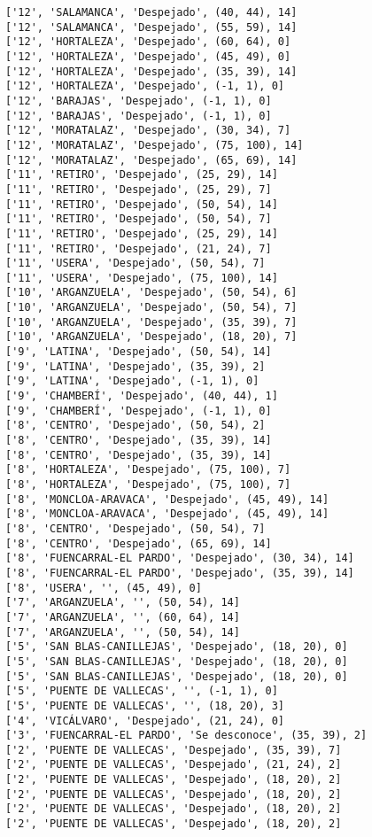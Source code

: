 \documentclass[11pt]{article}
\begin{document}
\begin{Verbatim}[commandchars=\\\{\}]
['12', 'SALAMANCA', 'Despejado', (40, 44), 14]
['12', 'SALAMANCA', 'Despejado', (55, 59), 14]
['12', 'HORTALEZA', 'Despejado', (60, 64), 0]
['12', 'HORTALEZA', 'Despejado', (45, 49), 0]
['12', 'HORTALEZA', 'Despejado', (35, 39), 14]
['12', 'HORTALEZA', 'Despejado', (-1, 1), 0]
['12', 'BARAJAS', 'Despejado', (-1, 1), 0]
['12', 'BARAJAS', 'Despejado', (-1, 1), 0]
['12', 'MORATALAZ', 'Despejado', (30, 34), 7]
['12', 'MORATALAZ', 'Despejado', (75, 100), 14]
['12', 'MORATALAZ', 'Despejado', (65, 69), 14]
['11', 'RETIRO', 'Despejado', (25, 29), 14]
['11', 'RETIRO', 'Despejado', (25, 29), 7]
['11', 'RETIRO', 'Despejado', (50, 54), 14]
['11', 'RETIRO', 'Despejado', (50, 54), 7]
['11', 'RETIRO', 'Despejado', (25, 29), 14]
['11', 'RETIRO', 'Despejado', (21, 24), 7]
['11', 'USERA', 'Despejado', (50, 54), 7]
['11', 'USERA', 'Despejado', (75, 100), 14]
['10', 'ARGANZUELA', 'Despejado', (50, 54), 6]
['10', 'ARGANZUELA', 'Despejado', (50, 54), 7]
['10', 'ARGANZUELA', 'Despejado', (35, 39), 7]
['10', 'ARGANZUELA', 'Despejado', (18, 20), 7]
['9', 'LATINA', 'Despejado', (50, 54), 14]
['9', 'LATINA', 'Despejado', (35, 39), 2]
['9', 'LATINA', 'Despejado', (-1, 1), 0]
['9', 'CHAMBERÍ', 'Despejado', (40, 44), 1]
['9', 'CHAMBERÍ', 'Despejado', (-1, 1), 0]
['8', 'CENTRO', 'Despejado', (50, 54), 2]
['8', 'CENTRO', 'Despejado', (35, 39), 14]
['8', 'CENTRO', 'Despejado', (35, 39), 14]
['8', 'HORTALEZA', 'Despejado', (75, 100), 7]
['8', 'HORTALEZA', 'Despejado', (75, 100), 7]
['8', 'MONCLOA-ARAVACA', 'Despejado', (45, 49), 14]
['8', 'MONCLOA-ARAVACA', 'Despejado', (45, 49), 14]
['8', 'CENTRO', 'Despejado', (50, 54), 7]
['8', 'CENTRO', 'Despejado', (65, 69), 14]
['8', 'FUENCARRAL-EL PARDO', 'Despejado', (30, 34), 14]
['8', 'FUENCARRAL-EL PARDO', 'Despejado', (35, 39), 14]
['8', 'USERA', '', (45, 49), 0]
['7', 'ARGANZUELA', '', (50, 54), 14]
['7', 'ARGANZUELA', '', (60, 64), 14]
['7', 'ARGANZUELA', '', (50, 54), 14]
['5', 'SAN BLAS-CANILLEJAS', 'Despejado', (18, 20), 0]
['5', 'SAN BLAS-CANILLEJAS', 'Despejado', (18, 20), 0]
['5', 'SAN BLAS-CANILLEJAS', 'Despejado', (18, 20), 0]
['5', 'PUENTE DE VALLECAS', '', (-1, 1), 0]
['5', 'PUENTE DE VALLECAS', '', (18, 20), 3]
['4', 'VICÁLVARO', 'Despejado', (21, 24), 0]
['3', 'FUENCARRAL-EL PARDO', 'Se desconoce', (35, 39), 2]
['2', 'PUENTE DE VALLECAS', 'Despejado', (35, 39), 7]
['2', 'PUENTE DE VALLECAS', 'Despejado', (21, 24), 2]
['2', 'PUENTE DE VALLECAS', 'Despejado', (18, 20), 2]
['2', 'PUENTE DE VALLECAS', 'Despejado', (18, 20), 2]
['2', 'PUENTE DE VALLECAS', 'Despejado', (18, 20), 2]
['2', 'PUENTE DE VALLECAS', 'Despejado', (18, 20), 2]

\end{Verbatim}
\end{document}

